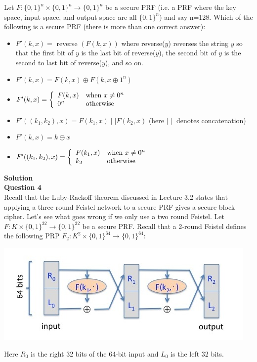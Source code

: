 \documentclass[a4paper,12pt]{article}
\begin{document}
Let $F:\{0,1\}^{n}\times \{0,1\}^{n}\rightarrow \{0,1\}^{n}$ be a secure PRF (i.e. a PRF where the key space, input space, and output space are all $\{0,1\}^{n}$) and say n=128. Which of the following is a secure PRF (there is more than one correct answer):
%
\begin{itemize}
\item $F'(k,x)=$ reverse $(F(k,x))$ where reverse($y$) reverses the string $y$ so that the first bit of $y$ is the last bit of reverse($y$), the second bit of $y$ is the second to last bit of reverse($y$), and so on.
\item $F'(k,x)=F(k, x)\oplus F(k, x\oplus 1^{n})$
\item $F'(k, x)=\left\{\begin{array}{l l}
F(k,x) & \mbox{when } x \neq 0^{n} \\
0^{n} & \mbox{otherwise}
\end{array}
\right.
$
\item $F'((k_{1},k_{2}), x)=F(k_{1},x)  \mid \mid F(k_{2},x)$    (here $\mid \mid$ denotes concatenation)
\item $F'(k, x)=k\oplus x$
\item $F'((k_{1},k_{2}), x)=\left\{\begin{array}{l l}
F(k_{1},x) & \mbox{when } x \neq 0^{n}\\
k_{2} & \mbox{otherwise}
\end{array}
\right.
$
\end{itemize}
\textbf{Solution} \\

\textbf{Question 4} \\

Recall that the Luby-Rackoff theorem discussed in Lecture 3.2 states that applying a three round Feistel network to a secure PRF gives a secure block cipher. Let's see what goes wrong if we only use a two round Feistel. Let $F:K\times \{0,1\}^{32}\rightarrow \{0,1\}^{32}$ be a secure PRF. Recall that a 2-round Feistel defines the following PRP   $F_{2}:K^{2}\times \{0,1\}^{64}\rightarrow \{0,1\}^{64}$:\\
%
\begin{center}
\includegraphics[scale=0.5]{question4-feistel.jpg} 
\end{center}
%
Here $R_{0}$ is the right 32 bits of the 64-bit input and $L_{0}$ is the left 32 bits. \\
\end{document}
